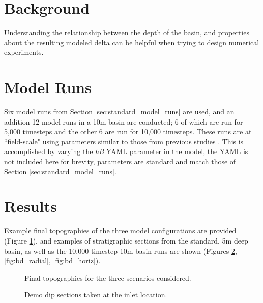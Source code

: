\section{Background}
Understanding the relationship between the depth of the basin, and properties about the resulting modeled delta can be helpful when trying to design numerical experiments.

\section{Model Runs}
Six model runs from Section \ref{sec:standard_model_runs} are used, and an addition 12 model runs in a 10m basin are conducted; 6 of which are run for 5,000 timesteps and the other 6 are run for 10,000 timesteps.
These runs are at ``field-scale" using parameters similar to those from previous studies \cite{Liang2016, Liang2016a}.
This is accomplished by varying the \textit{hB} YAML parameter in the model, the YAML is not included here for brevity, parameters are standard and match those of Section \ref{sec:standard_model_runs}.

\section{Results}
Example final topographies of the three model configurations are provided (Figure \ref{fig:bd_final_topos}), and examples of stratigraphic sections from the standard, 5m deep basin, as well as the 10,000 timestep 10m basin runs are shown (Figures \ref{fig:bd_dips}, \ref{fig:bd_radial}, \ref{fig:bd_horiz}). 

\begin{figure}[!ht]
	\caption{Final topographies for the three scenarios considered.}
	\label{fig:bd_final_topos}
\end{figure}

\begin{figure}[!ht]
	\caption{Demo dip sections taken at the inlet location.}
	\label{fig:bd_dips}
\end{figure}


